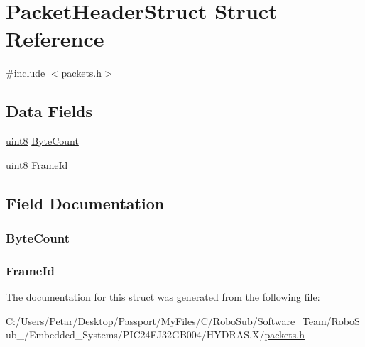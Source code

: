 \hypertarget{struct_packet_header_struct}{}\section{Packet\+Header\+Struct Struct Reference}
\label{struct_packet_header_struct}


{\ttfamily \#include $<$packets.\+h$>$}

\subsection*{Data Fields}
\begin{DoxyCompactItemize}
\item 
\hyperlink{_h_y_d_r_a_s_8_x_2types_8h_a33a5e996e7a90acefb8b1c0bea47e365}{uint8} \hyperlink{struct_packet_header_struct_a570f82b1241060a07972491eec9f7391}{Byte\+Count}
\item 
\hyperlink{_h_y_d_r_a_s_8_x_2types_8h_a33a5e996e7a90acefb8b1c0bea47e365}{uint8} \hyperlink{struct_packet_header_struct_a40efda5105cf47960cd2ddae503fe1d9}{Frame\+Id}
\end{DoxyCompactItemize}


\subsection{Field Documentation}
\hypertarget{struct_packet_header_struct_a570f82b1241060a07972491eec9f7391}{}
\subsubsection[{Byte\+Count}]{ Byte\+Count}\label{struct_packet_header_struct_a570f82b1241060a07972491eec9f7391}
\hypertarget{struct_packet_header_struct_a40efda5105cf47960cd2ddae503fe1d9}{}
\subsubsection[{Frame\+Id}]{ Frame\+Id}\label{struct_packet_header_struct_a40efda5105cf47960cd2ddae503fe1d9}


The documentation for this struct was generated from the following file\+:\begin{DoxyCompactItemize}
\item 
C\+:/\+Users/\+Petar/\+Desktop/\+Passport/\+My\+Files/\+C/\+Robo\+Sub/\+Software\+\_\+\+Team/\+Robo\+Sub\+\_/\+Embedded\+\_\+\+Systems/\+P\+I\+C24\+F\+J32\+G\+B004/\+H\+Y\+D\+R\+A\+S.\+X/\hyperlink{_h_y_d_r_a_s_8_x_2packets_8h}{packets.\+h}\end{DoxyCompactItemize}
